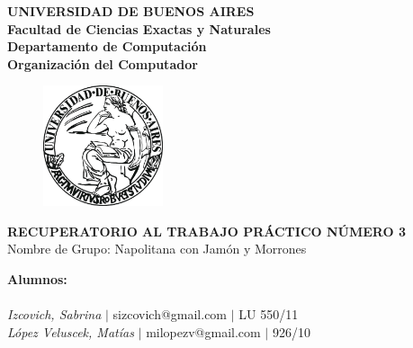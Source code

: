 \documentclass[10pt, a4paper]{article}
\begin{document}
\thispagestyle{empty}
\begin{center}

\Huge{ \bf{UNIVERSIDAD DE BUENOS AIRES}}
\\
\LARGE{\bf{Facultad de Ciencias Exactas y Naturales}}
\\
\textbf{Departamento de Computaci\'on}
\\
\textbf{Organizaci\'on del Computador}
\vspace{2.0\baselineskip}
\end{center}


\begin{figure}[h] %
\begin{center}
\includegraphics[width=100pt]{./image.jpeg}
\end{center}
\end{figure}
\begin{center}
\vspace*{0.7cm}

\huge{\bf RECUPERATORIO AL TRABAJO PR\'ACTICO N\'UMERO 3}\\
\huge{Nombre de Grupo: Napolitana con Jam\'on y Morrones}
\vspace*{8cm}

\end{center}

\huge{\textbf{Alumnos:}}\\
\\
\vspace*{0.3cm}
\Large{\textsl{Izcovich, Sabrina} $|$ sizcovich@gmail.com $|$ LU 550/11}\\
\vspace*{0.3cm}
\Large{\textsl{L\'opez Veluscek, Matías} \hspace{0.1cm}$|$ milopezv@gmail.com $|$ 926/10}\\
\vspace*{0.3cm}
\vspace{0.5cm}
 
\newpage
\thispagestyle{empty}
\tableofcontents
\newpage
\end{document}
